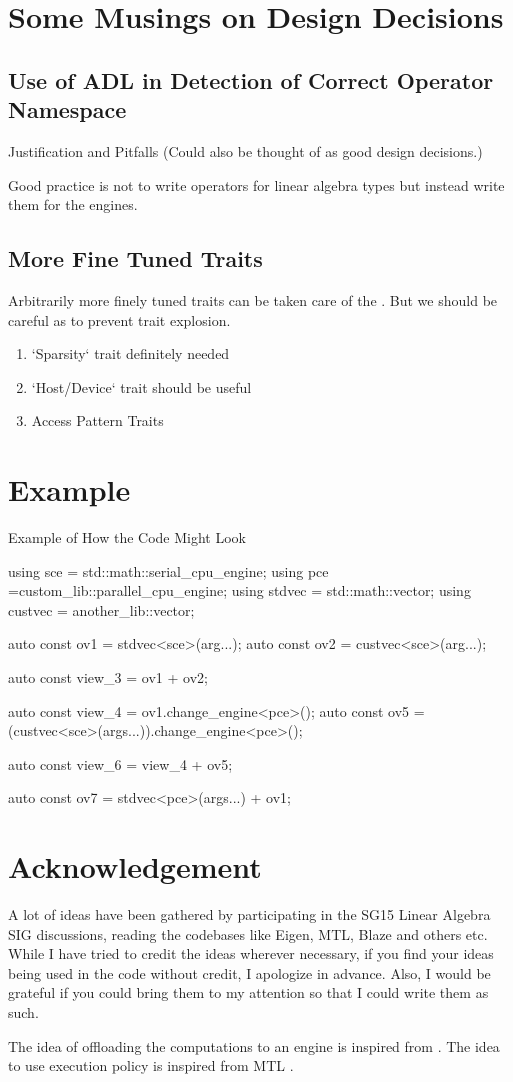 \documentclass[oneside,11pt,a4paper]{jbarticle}
\begin{document}
\section{Some Musings on Design Decisions}
\subsection{Use of ADL in Detection of Correct Operator Namespace}
Justification and Pitfalls (Could also be thought of as good design decisions.)

Good practice is not to write operators for linear algebra types but instead
write them for the engines.
\subsection{More Fine Tuned Traits}
Arbitrarily more finely tuned traits can be taken care of the
.  But we should be careful as to prevent trait
explosion.
\begin{enumerate}
  \item  `Sparsity`  trait definitely needed
  \item  `Host/Device` trait should be useful
  \item  Access Pattern Traits
\end{enumerate}
\section{Example}

\begin{codecpp}{Example of How the Code Might Look}

  using sce = std::math::serial_cpu_engine;
  using pce =custom_lib::parallel_cpu_engine;
  using stdvec = std::math::vector;
  using custvec = another_lib::vector;

  auto const ov1 = stdvec<sce>(arg...);
  auto const ov2 = custvec<sce>(arg...);

  auto const view_3 = ov1 + ov2;

  auto const view_4 = ov1.change_engine<pce>();
  auto const ov5 = (custvec<sce>(args...)).change_engine<pce>();

  auto const view_6 = view_4 + ov5;

  auto const ov7 = stdvec<pce>(args...) + ov1;

\end{codecpp}
\section{Acknowledgement}
A lot of ideas have been gathered by participating in the SG15 Linear Algebra
SIG discussions, reading the codebases like Eigen, MTL, Blaze and others etc.
While I have tried to credit the ideas wherever necessary, if you find your
ideas being used in the code without credit, I apologize in advance. Also, I
would be grateful if you could bring them to my attention so that I could write
them as such.

The idea of offloading the computations to an engine is inspired from
\cite{GuyDavidson2018}. The idea to use execution policy is inspired from MTL
.


\printbibliography
\end{document}
